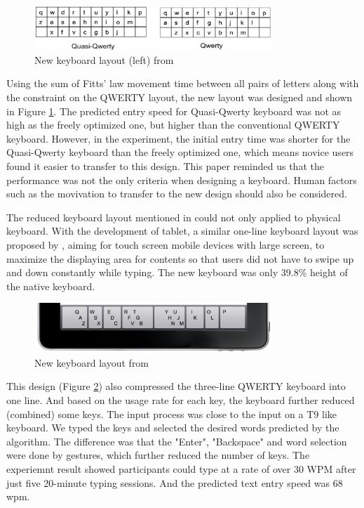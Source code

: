 \documentclass[11pt]{article}
\begin{document}
\begin{figure}[H]
  \centering
  \includegraphics[width=0.8\textwidth]{Layout2010.png}
  \caption{New keyboard layout (left) from \citep{10.1145/1753326.1753367}}
  \label{fig:layout2010}
\end{figure}

Using the sum of Fitts’ law movement time between all pairs of letters along with the constraint on the QWERTY layout, the new layout was designed and shown in Figure \ref{fig:layout2010}. The predicted entry speed for Quasi-Qwerty keyboard was not as high as the freely optimized one, but higher than the conventional QWERTY keyboard. However, in the experiment, the initial entry time was shorter for the Quasi-Qwerty keyboard than the freely optimized one, which means novice users found it easier to transfer to this design. This paper reminded us that the performance was not the only criteria when designing a keyboard. Human factors such as the movivation to transfer to the new design should also be considered.

The reduced keyboard layout mentioned in \citet{10.1145/985921.986082} could not only applied to physical keyboard. With the development of tablet, a similar one-line keyboard layout was proposed by \citet{10.1145/2047196.2047257}, aiming for touch screen mobile devices with large screen, to maximize the displaying area for contents so that users did not have to swipe up and down constantly while typing. The new keyboard was only 39.8\% height of the native keyboard.

\begin{figure}[H]
  \centering
  \includegraphics[width=0.8\textwidth]{Layout2011.png}
  \caption{New keyboard layout from \citep{10.1145/2047196.2047257}}
  \label{fig:layout2011}
\end{figure}

This design (Figure \ref{fig:layout2011}) also compressed the three-line QWERTY keyboard into one line. And based on the usage rate for each key, the keyboard further reduced (combined) some keys. The input process was close to the input on a T9 like keyboard. We typed the keys and selected the desired words predicted by the algorithm. The difference was that the "Enter", "Backspace" and word selection were done by gestures, which further reduced the number of keys. The experiemnt result showed participants could type at a rate of over 30 WPM after just five 20-minute typing sessions. And the predicted text entry speed was 68 wpm.
\end{document}
